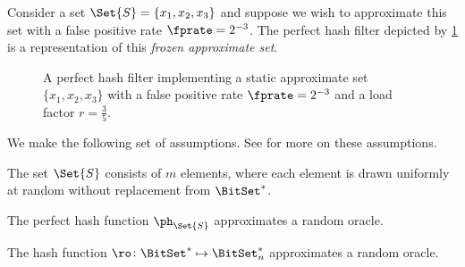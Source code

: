 \documentclass[ ../main.tex]{subfiles}
\begin{document}
\begin{example}
Consider a set $\Set{S} = \{x_1, x_2, x_3\}$ and suppose we wish to approximate this set with a false positive rate $\fprate = 2^{-3}$. The perfect hash filter depicted by \cref{fig:PHFilter} is a representation of this \emph{frozen approximate set}.
\end{example}
\begin{figure}
\caption[Perfect hash filter]{A perfect hash filter implementing a static approximate set $\{x_1,x_2,x_3\}$ with a false positive rate $\fprate = 2^{-3}$ and a load factor $r = \frac{3}{5}$.}
\label{fig:PHFilter}
\centering

\end{figure}

We make the following set of assumptions. See \cite{oph} for more on these assumptions.
\begin{assumption}
The set $\Set{S}$ consists of $m$ elements, where each element is drawn uniformly at random without replacement from $\BitSet^*$.
\end{assumption}
\begin{assumption}
The perfect hash function $\ph_{\Set{S}}$ approximates a random oracle.
\end{assumption}
\begin{assumption}
\label{asm:ro}
The hash function $\ro \colon \BitSet^* \mapsto \BitSet^*_n$ approximates a random oracle.
\end{assumption}
\end{document}

